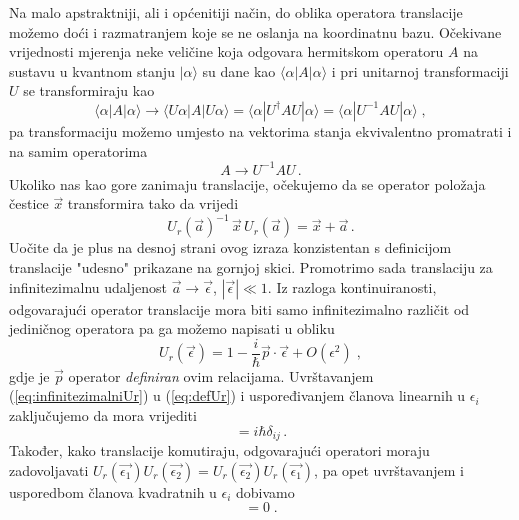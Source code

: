 Na malo apstraktniji, ali i općenitiji način, do oblika operatora translacije
možemo doći i razmatranjem koje se ne oslanja na koordinatnu bazu.
Očekivane vrijednosti mjerenja neke veličine koja odgovara hermitskom operatoru $A$
na sustavu u kvantnom stanju $|\alpha\rangle$ 
su dane kao $\langle \alpha | A | \alpha \rangle$ i pri unitarnoj transformaciji $U$
se transformiraju kao 
\begin{equation}
    \langle \alpha | A | \alpha \rangle \to
    \langle U \alpha | A | U \alpha \rangle =
    \langle \alpha | U^{\dagger} A U |  \alpha \rangle =
    \langle \alpha | U^{-1} A U |  \alpha \rangle \;,
\end{equation}
pa transformaciju možemo umjesto na vektorima stanja ekvivalentno promatrati
i na samim operatorima
\begin{equation}
    A \to U^{-1} A U \,.
\end{equation}
Ukoliko nas kao gore zanimaju translacije, očekujemo da se operator položaja
čestice $\vec{x}$ transformira tako da vrijedi
\begin{equation}
    U_{r}(\vec{a})^{-1} \,\vec{x} \, U_{r}(\vec{a}) = \vec{x} + \vec{a} \,.
   \label{eq:defUr}
\end{equation}
Uočite da je plus na desnoj strani ovog izraza konzistentan s definicijom
translacije "udesno" prikazane na gornjoj skici.
Promotrimo sada translaciju za infinitezimalnu udaljenost $\vec{a} \to \vec{\epsilon}$,
$|\vec{\epsilon}| \ll 1$.
Iz razloga kontinuiranosti, odgovarajući operator translacije mora biti
samo infinitezimalno različit od jediničnog operatora pa ga možemo
napisati u obliku
\begin{equation}
    U_{r}(\vec{\epsilon}) = 1 - \frac{i}{\hbar} \vec{p}\cdot\vec{\epsilon} + O(\epsilon^2) \;,
    \label{eq:infinitezimalniUr}
\end{equation}
gdje je $\vec{p}$ operator \emph{definiran} ovim relacijama. Uvrštavanjem
(\ref{eq:infinitezimalniUr}) u (\ref{eq:defUr}) i uspoređivanjem članova
linearnih u $\epsilon_i$ zaključujemo da mora vrijediti
\begin{equation}
    [x_i, p_j] = i\hbar \delta_{ij}\,.
    \label{eq:xpkomutacija}
\end{equation}
Također, kako translacije komutiraju, odgovarajući operatori moraju
zadovoljavati $U_{r}(\vec{\epsilon_1}) U_{r}(\vec{\epsilon_2}) =
U_{r}(\vec{\epsilon_2})U_{r}(\vec{\epsilon_1})$,
pa opet uvrštavanjem i usporedbom članova kvadratnih u $\epsilon_i$
dobivamo
\begin{equation}
    [p_i, p_j] = 0 \;.
    \label{eq:ppkomutacija}
\end{equation}

